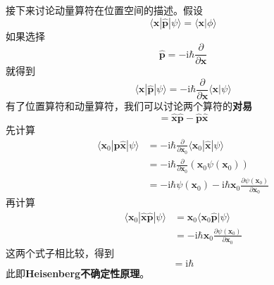         接下来讨论动量算符在位置空间的描述。假设
        \begin{equation}
            \langle \bm{x} |\hat{\bm{p}} | \psi \rangle
            = \langle \bm{x} | \phi \rangle
        \end{equation}
        如果选择
        \begin{equation}
            \hat{\bm{p}} = -\mathrm{i}\hbar \frac {\partial }{\partial \bm{x}}
        \end{equation}
        就得到
        \begin{equation}
            \langle \bm{x} |\hat{\bm{p}} | \psi \rangle = -\mathrm{i}\hbar \frac {\partial }{\partial \bm{x}}\langle \bm{x} | \psi \rangle
        \end{equation}
        有了位置算符和动量算符，我们可以讨论两个算符的\textbf{对易}
        \begin{equation}
            [\hat{\bm{x}},\hat{\bm{p}}] = \hat{\bm{x}}\hat{\bm{p}} - \hat{\bm{p}}\hat{\bm{x}}
        \end{equation}
        先计算
        \begin{equation}\begin{aligned}
            \langle \bm{x}_0 |\hat{\bm{p}}\hat{\bm{x}} | \psi \rangle &= -\mathrm{i}\hbar \frac {\partial}{\partial \bm{x}_0} \langle \bm{x}_0 |\hat{\bm{x}} | \psi \rangle\\
            &= -\mathrm{i}\hbar \frac {\partial}{\partial \bm{x}_0} (\bm{x}_0\psi(\bm{x}_0))\\
            &= -\mathrm{i}\hbar \psi(\bm{x}_0) - \mathrm{i}\hbar \bm{x}_0 \frac {\partial \psi(\bm{x}_0)}{\partial \bm{x}_0}
        \end{aligned}\end{equation}
        再计算
        \begin{equation}\begin{aligned}
            \langle \bm{x}_0 |\hat{\bm{x}} \hat{\bm{p}} | \psi \rangle &= \bm{x}_0 \langle \bm{x}_0 \hat{\bm{p}} | \psi \rangle\\
            &= -\mathrm{i}\hbar \bm{x}_0 \frac {\partial \psi(\bm{x}_0)}{\partial \bm{x}_0}
        \end{aligned}\end{equation}
        这两个式子相比较，得到
        \begin{equation}
            [\hat{\bm{x}},\hat{\bm{p}}] = \mathrm{i}\hbar
        \end{equation}
        此即\textbf{Heisenberg不确定性原理}。

